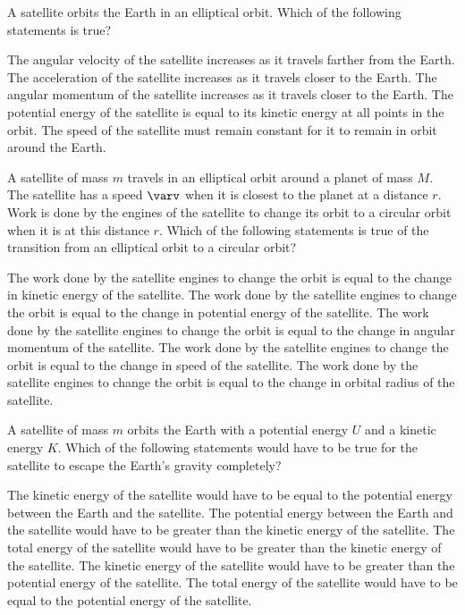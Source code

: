 \documentclass{../../oss-apphys-exam}
\newcounter{last}
\begin{document}
\begin{multicols*}{2}
\begin{questions}
    \question A satellite orbits the Earth in an elliptical orbit. Which of the
    following statements is true?
    \begin{choices}
      \choice The angular velocity of the satellite increases as it travels
      farther from the Earth.
      \choice The acceleration of the satellite increases as it travels closer
      to the Earth.
      \choice The angular momentum of the satellite increases as it travels
      closer to the Earth.
      \choice The potential energy of the satellite is equal to its kinetic
      energy at all points in the orbit.
      \choice The speed of the satellite must remain constant for it to remain
      in orbit around the Earth.
    \end{choices}
    \vspace{.7in}
    
    \question A satellite of mass $m$ travels in an elliptical orbit around a
    planet of mass $M$. The satellite has a speed $\varv$ when it is closest to
    the planet at a distance $r$. Work is done by the engines of the satellite
    to change its orbit to a circular orbit when it is at this distance $r$.
    Which of the following statements is true of the transition from an
    elliptical orbit to a circular orbit?
    \begin{choices}
      \choice The work done by the satellite engines to change the orbit is
      equal to the change in kinetic energy of the satellite.
      \choice The work done by the satellite engines to change the orbit is
      equal to the change in potential energy of the satellite.
      \choice The work done by the satellite engines to change the orbit is
      equal to the change in angular momentum of the satellite.
      \choice The work done by the satellite engines to change the orbit is
      equal to the change in speed of the satellite.
      \choice The work done by the satellite engines to change the orbit is
      equal to the change in orbital radius of the satellite.
    \end{choices}
    \columnbreak
    
    \question A satellite of mass $m$ orbits the Earth with a potential energy
    $U$ and a kinetic energy $K$. Which of the following statements would have
    to be true for the satellite to escape the Earth's gravity completely?
    \begin{choices}
      \choice The kinetic energy of the satellite would have to be equal to the
      potential energy between the Earth and the satellite.
      \choice The potential energy between the Earth and the satellite would
      have to be greater than the kinetic energy of the satellite.
      \choice The total energy of the satellite would have to be greater than
      the kinetic energy of the satellite.
      \choice The kinetic energy of the satellite would have to be greater than
      the potential energy of the satellite.
      \choice The total energy of the satellite would have to be equal to the
      potential energy of the satellite.
    \end{choices}
  \end{questions}
  \setcounter{last}{\value{question}}
\end{multicols*}
\end{document}
